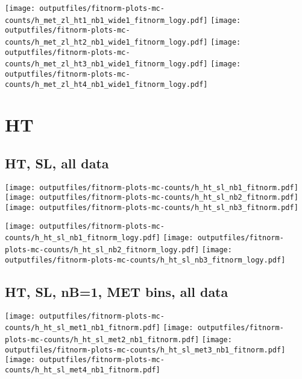 \documentclass[11pt]{article}
\begin{document}
    \noindent
     \texttt{[image: outputfiles/fitnorm-plots-mc-counts/h\_met\_zl\_ht1\_nb1\_wide1\_fitnorm\_logy.pdf]}
     \texttt{[image: outputfiles/fitnorm-plots-mc-counts/h\_met\_zl\_ht2\_nb1\_wide1\_fitnorm\_logy.pdf]}
     \texttt{[image: outputfiles/fitnorm-plots-mc-counts/h\_met\_zl\_ht3\_nb1\_wide1\_fitnorm\_logy.pdf]}
     \texttt{[image: outputfiles/fitnorm-plots-mc-counts/h\_met\_zl\_ht4\_nb1\_wide1\_fitnorm\_logy.pdf]}


    \clearpage









   \section{HT}

    \subsection{ HT, SL, all data}

    \noindent
     \texttt{[image: outputfiles/fitnorm-plots-mc-counts/h\_ht\_sl\_nb1\_fitnorm.pdf]}
     \texttt{[image: outputfiles/fitnorm-plots-mc-counts/h\_ht\_sl\_nb2\_fitnorm.pdf]}
     \texttt{[image: outputfiles/fitnorm-plots-mc-counts/h\_ht\_sl\_nb3\_fitnorm.pdf]}

    \noindent
     \texttt{[image: outputfiles/fitnorm-plots-mc-counts/h\_ht\_sl\_nb1\_fitnorm\_logy.pdf]}
     \texttt{[image: outputfiles/fitnorm-plots-mc-counts/h\_ht\_sl\_nb2\_fitnorm\_logy.pdf]}
     \texttt{[image: outputfiles/fitnorm-plots-mc-counts/h\_ht\_sl\_nb3\_fitnorm\_logy.pdf]}


     \subsection{ HT, SL, nB=1, MET bins, all data}

    \noindent
     \texttt{[image: outputfiles/fitnorm-plots-mc-counts/h\_ht\_sl\_met1\_nb1\_fitnorm.pdf]}
     \texttt{[image: outputfiles/fitnorm-plots-mc-counts/h\_ht\_sl\_met2\_nb1\_fitnorm.pdf]}
     \texttt{[image: outputfiles/fitnorm-plots-mc-counts/h\_ht\_sl\_met3\_nb1\_fitnorm.pdf]}
     \texttt{[image: outputfiles/fitnorm-plots-mc-counts/h\_ht\_sl\_met4\_nb1\_fitnorm.pdf]}
\end{document}
